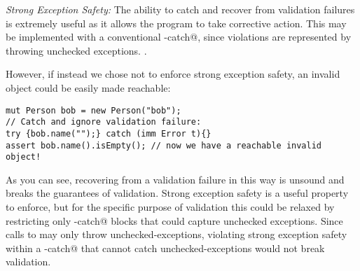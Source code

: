 %
%

\loseSpace
\noindent\textit{Strong Exception Safety:}
The ability to catch and recover from validation failures is extremely useful as it allows the program to take corrective action.
This may be implemented with a conventional \Q@try-catch@, since violations are represented by throwing unchecked exceptions. .

However, if instead we chose not to enforce strong exception safety, an invalid object could be easily made reachable:
\saveSpace
\begin{lstlisting}[morekeywords={assert}, escapechar=\%]
mut Person bob = new Person("bob");
// Catch and ignore validation failure:
try {bob.name("");} catch (imm Error t){}
assert bob.name().isEmpty(); // now we have a reachable invalid object!
\end{lstlisting}
\saveSpace
As you can see, recovering from a validation failure in this way is unsound and breaks the guarantees of validation.
Strong exception safety is a useful property to enforce, but for the specific purpose of validation this could be relaxed by restricting only \Q@try-catch@ blocks that could capture unchecked exceptions.
Since calls to \validate{} may only throw unchecked-exceptions, violating strong exception safety within a \Q@try-catch@ that cannot catch unchecked-exceptions would not break validation.





